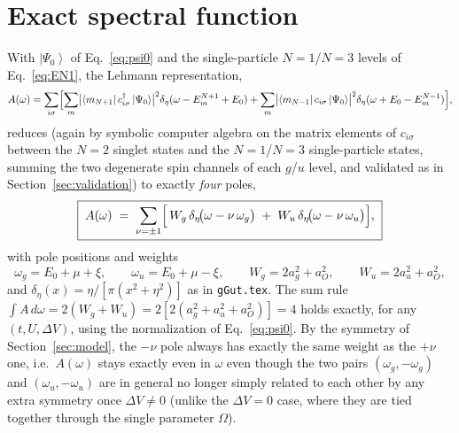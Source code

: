 \documentclass[11pt]{article}
\newcommand{\ket}[1]{\left|#1\right\rangle}
\newcommand{\mel}[3]{\left\langle#1\right|#2\left|#3\right\rangle}
\newcommand{\acre}[1]{c^{\dagger}_{#1}}
\newcommand{\aani}[1]{c_{#1}}
\begin{document}
\section{Exact spectral function}
\label{sec:spectral}

With $\ket{\Psi_0}$ of Eq.~\eqref{eq:psi0} and the single-particle $N{=}1$/$N{=}3$ levels
of Eq.~\eqref{eq:EN1}, the Lehmann representation,
\begin{equation}
  A(\omega)=\sum_{i\sigma}\Bigl[\sum_m\bigl|\mel{m_{N+1}}{\acre{i\sigma}}{\Psi_0}\bigr|^2\delta_\eta(\omega-E_m^{N+1}+E_0)
    +\sum_m\bigl|\mel{m_{N-1}}{\aani{i\sigma}}{\Psi_0}\bigr|^2\delta_\eta(\omega+E_0-E_m^{N-1})\Bigr],
  \label{eq:Aw-general}
\end{equation}
reduces (again by symbolic computer algebra on the matrix elements of $c_{i\sigma}$
between the $N{=}2$ singlet states and the $N{=}1$/$N{=}3$ single-particle states,
summing the two degenerate spin channels of each $g$/$u$ level, and validated as in
Section~\ref{sec:validation}) to exactly \emph{four} poles,
\begin{equation}
  \boxed{\;
  A(\omega) \;=\; \sum_{\nu=\pm1}\Bigl[\,W_g\,\delta_\eta\!\bigl(\omega-\nu\,\omega_g\bigr)
                                     \;+\; W_u\,\delta_\eta\!\bigl(\omega-\nu\,\omega_u\bigr)\Bigr],
  \;}
  \label{eq:Aw-deltaV}
\end{equation}
with pole positions and weights
\begin{equation}
  \omega_g = E_0+\mu+\xi,\qquad \omega_u = E_0+\mu-\xi,\qquad
  W_g = 2a_g^2+a_O^2,\qquad W_u = 2a_u^2+a_O^2,
  \label{eq:weights}
\end{equation}
and $\delta_\eta(x)=\eta/[\pi(x^2+\eta^2)]$ as in \texttt{gGut.tex}. The sum rule
$\int A\,d\omega = 2(W_g+W_u)=2[2(a_g^2+a_u^2+a_O^2)]=4$ holds exactly, for any
$(t,U,\Delta V)$, using the normalization of Eq.~\eqref{eq:psi0}. By the symmetry of
Section~\ref{sec:model}, the $-\nu$ pole always has exactly the same weight as the $+\nu$
one, i.e.\ $A(\omega)$ stays exactly even in $\omega$ even though the two pairs
$(\omega_g,-\omega_g)$ and $(\omega_u,-\omega_u)$ are in general no longer simply related
to each other by any extra symmetry once $\Delta V\neq0$ (unlike the $\Delta V=0$ case,
where they are tied together through the single parameter $\Omega$).
\end{document}
